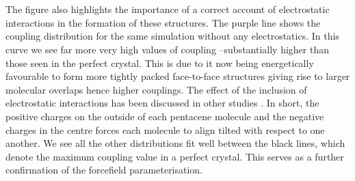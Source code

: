\\\\
The figure also highlights the importance of a correct account of electrostatic interactions in the formation of these structures. The purple line shows the coupling distribution for the same simulation without any electrostatics. In this curve we see far more very high values of coupling --substantially higher than those seen in the perfect crystal. This is due to it now being energetically favourable to form  more tightly packed face-to-face structures giving rise to larger molecular overlaps hence higher couplings. The effect of the inclusion of electrostatic interactions has been discussed in other studies \cite{C7CE01700F, Ryno2014, Kafer2008}. In short, the positive charges on the outside of each pentacene molecule and the negative charges in the centre forces each molecule to align tilted with respect to one another. We see all the other distributions fit well between the  black lines, which denote the maximum coupling value in a perfect crystal. This serves as a further confirmation of the forcefield parameterisation.
